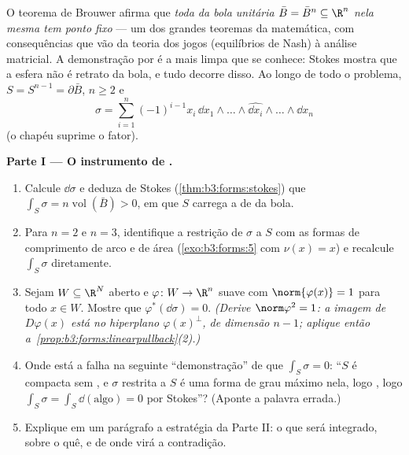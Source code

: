 \begin{problem}\label{pb:b3:forms:1}
O teorema de Brouwer afirma que \emph{toda  da bola
unitária  $\bar B = \bar B^n \subseteq \R^n$ nela mesma tem ponto fixo} --- um dos grandes
teoremas da matemática, com consequências que vão da teoria dos jogos
(equilíbrios de Nash) à análise matricial. A demonstração por  é a mais limpa que se conhece: Stokes mostra que a esfera
não é retrato da bola, e tudo decorre disso. Ao longo de todo o
problema, $S = S^{n-1} = \partial\bar B$, $n \geq 2$ e
\[
\sigma = \sum_{i=1}^n(-1)^{i-1}x_i\,
\dd x_1\wedge\dots\wedge\widehat{\dd x_i}\wedge\dots\wedge
\dd x_n
\]
(o chapéu suprime o fator).

\medskip
\noindent\textbf{Parte I --- O instrumento de .}
\begin{enumerate}
  \item Calcule $\dd\sigma$ e deduza de Stokes (\cref{thm:b3:forms:stokes}) que $\int_S\sigma =
        n\operatorname{vol}(\bar B) > 0$, em
        que $S$ carrega a  de  da bola.
  \item Para $n = 2$ e $n = 3$, identifique a restrição de
        $\sigma$ a $S$ com as formas de comprimento de arco e de
        área (\cref{exo:b3:forms:5} com $\nu(x) = x$) e recalcule $\int_S\sigma$ diretamente.
  \item Sejam $W \subseteq \R^N$ aberto e $\varphi\colon W
        \to \R^n$ suave com $\norm{\varphi(x)} = 1$ para todo $x \in W$.
        Mostre que $\varphi^*(\dd\sigma) = 0$. \emph{(Derive $\norm\varphi^2 = 1$: a imagem de $D\varphi(x)$ está no
        hiperplano $\varphi(x)^\perp$, de dimensão $n - 1$; aplique então
        a~\cref{prop:b3:forms:linearpullback}(2).)}
  \item Onde está a falha na seguinte ``demonstração'' de que $\int_S\sigma = 0$:
        ``$S$ é compacta sem , e $\sigma$ restrita a $S$ é
        uma forma de grau máximo nela, logo , logo $\int_S\sigma =
        \int_S\dd(\text{algo}) = 0$ por
        Stokes''? (Aponte a palavra errada.)
  \item Explique em um parágrafo a estratégia da Parte II: o que será
        integrado, sobre o quê, e de onde virá a contradição.
\end{enumerate}


\end{problem}

